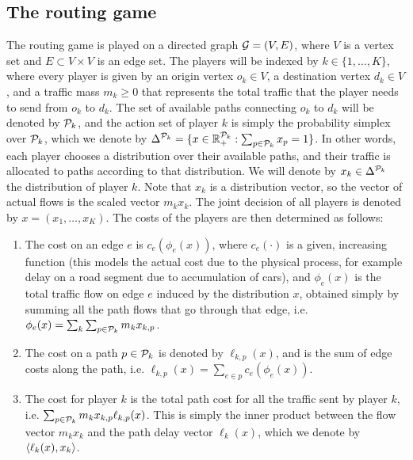 \documentclass{sig-alternate-ipsn13}
\begin{document}
\subsection{The routing game}
\label{sec:routing_game}
The routing game is played on a directed graph $\mathcal{G} = (V, E)$, where $V$ is a vertex set and $E \subset V \times V$ is an edge set. The players will be indexed by $k \in \{1, \dots, K\}$, where every player is given by an origin vertex $o_k \in V$, a destination vertex $d_k \in V$, and a traffic mass $m_k \geq 0$ that represents the total traffic that the player needs to send from $o_k$ to $d_k$. The set of available paths connecting $o_k$ to $d_k$ will be denoted by $\mathcal{P}_k$, and the action set of player $k$ is simply the probability simplex over $\mathcal{P}_k$, which we denote by $\Delta^{\mathcal{P}_k} = \{x \in \mathbb{R}_+^{\mathcal{P}_k} : \sum_{p \in \mathcal{P}_k} x_p = 1\}$. In other words, each player chooses a distribution over their available paths, and their traffic is allocated to paths according to that distribution. We will denote by $x_k\in \Delta^{\mathcal{P}_k}$ the distribution of player $k$. Note that $x_k$ is a distribution vector, so the vector of actual flows is the scaled vector $m_k x_k$. The joint decision of all players is denoted by $x = (x_1, \dots, x_K)$. The costs of the players are then determined as follows:
\begin{enumerate}[label=\alph*)]
\item The cost on an edge $e$ is $c_e(\phi_e(x))$, where $c_e(\cdot)$ is a given, increasing function (this models the actual cost due to the physical process, for example delay on a road segment due to accumulation of cars), and $\phi_e(x)$ is the total traffic flow on edge $e$ induced by the distribution $x$, obtained simply by summing all the path flows that go through that edge, i.e. $\phi_e(x) = \sum_k \sum_{p \in \mathcal{P}_k} m_k x_{k, p}$.
\item The cost on a path $p \in \mathcal{P}_k$ is denoted by $\ell_{k, p}(x)$, and is the sum of edge costs along the path, i.e. $\ell_{k, p}(x) = \sum_{e \in p} c_e(\phi_e(x))$.
\item The cost for player $k$ is the total path cost for all the traffic sent by player $k$, i.e. $\sum_{p \in \mathcal{P}_k} m_k x_{k, p} \ell_{k, p}(x)$. This is simply the inner product between the flow vector $m_k x_k$ and the path delay vector $\ell_k(x)$, which we denote by $\left\langle \ell_k(x), x_k \right\rangle$.
\end{enumerate}
\end{document}
